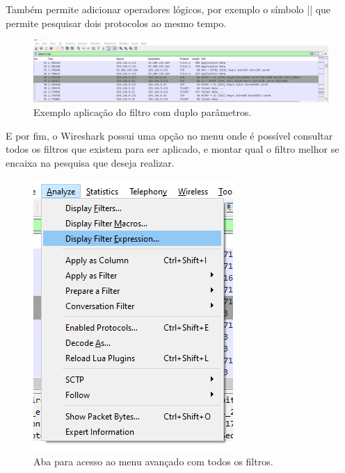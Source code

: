 \documentclass{llncs}
\begin{document}
\begin{enumerate}[\textbf{a)}]
    \begin{flushleft}
      \par Também permite adicionar operadores lógicos, por exemplo o símbolo || que permite pesquisar dois protocolos ao mesmo tempo. 
      \begin{figure}[h]
        \includegraphics[scale=0.3]{filter03.png}
        \centering
        \caption{Exemplo aplicação do filtro com duplo parâmetros.}
        \label{fig:filter03}
      \end{figure}  
    \end{flushleft}

    \begin{flushleft}
      \par E por fim, o Wireshark possui uma opção no menu onde é possível consultar todos os filtros que existem para ser aplicado, e montar qual o filtro melhor se encaixa na pesquisa que deseja realizar. 
      \begin{figure}[h]
        \includegraphics[scale=0.65]{menuwire01.png}
        \centering
        \caption{Aba para acesso ao menu avançado com todos os filtros.}
        \label{fig:menuwire01}
      \end{figure}  


\end{flushleft}
\end{enumerate}
\end{document}
